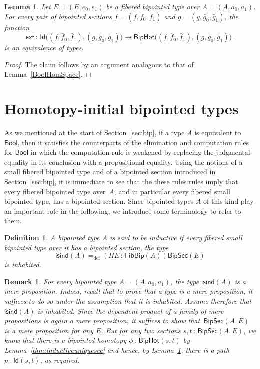 \documentclass[10pt,a4paper,oneside,reqno]{amsart}
\theoremstyle{mythm}
\newtheorem{lemma}[theorem]{Lemma}
\theoremstyle{mydef}
\newtheorem{definition}[theorem]{Definition}
\theoremstyle{myrmk}
\newtheorem{remark}[theorem]{Remark}
\newcommand{\ie}{\text{i.e.\ }}
\newcommand{\defeq}{=_{\mathrm{def}}}
\newcommand{\co}{\,{:}\,}
\newcommand{\isbipind}{\mathsf{isind}}
\newcommand{\ext}{\mathsf{ext}}
\newcommand{\Bool}{\mathsf{Bool}}
\newcommand{\Id}{\mathsf{Id}}
\newcommand{\BipHot}{\mathsf{BipHot}}
\newcommand{\FibBip}{\mathsf{FibBip}}
\newcommand{\BipSec}{\mathsf{BipSec}}
\begin{document}
\begin{lemma} \label{thm:biphot}
Let $E = (E, e_0, e_1)$ be a fibered bipointed type over $A = (A, a_0, a_1)$. 
For every pair of bipointed sections $f = (f, \bar{f}_0, \bar{f}_1)$ and $g = (g, \bar{g}_0, \bar{g}_1)$, 
the function
\[
\ext \co \Id\big( (f, \bar{f}_0, \bar{f}_1), (g, \bar{g}_0, \bar{g}_1) \big) \rightarrow
\BipHot \big( (f, \bar{f}_0, \bar{f}_1), (g, \bar{g}_0, \bar{g}_1) \big) \, .
\]
is an equivalence of types. 
\end{lemma}


\begin{proof} The claim follows by an argument analogous to that of Lemma~\ref{BoolHomSpace}.
\end{proof}







\section{Homotopy-initial bipointed types} 
\label{sec:homibt}


As we mentioned at the start of Section~\ref{sec:bip}, if a type $A$ is equivalent to $\Bool$, then 
it satisfies the counterparts of the elimination and computation rules for $\Bool$ in which the computation rule is 
weakened by replacing the judgmental equality in its conclusion with a propositional equality. Using the notions of a small fibered bipointed type and of a bipointed section introduced in Section~\ref{sec:bip}, it is immediate to see that the these rules rules imply that every fibered bipointed type over~$A$, and in particular every fibered small bipointed type, has a bipointed section. 
Since bipointed types $A$ of this kind  play an important role in the following, we introduce some terminology to refer to them.


 



\begin{definition} A bipointed type $A$ is said to be \emph{inductive} if every fibered small bipointed type over it has a bipointed section, \ie the type
\[ 
\isbipind(A) \defeq (\Pi E \co \FibBip(A))  \BipSec(E)
\]  
is inhabited. \end{definition} 



\begin{remark} For every bipointed type $A = (A, a_0, a_1)$, the type $\isbipind(A)$ is a mere proposition. Indeed, recall that to prove that a type  is a mere proposition, it suffices to do so under the assumption that it is inhabited. Assume therefore that~$\isbipind(A)$ is inhabited. Since the dependent product of a family of mere propositions is again a mere proposition, it suffices to show that~$\BipSec(A,E)$ is a mere proposition for any $E$. But for any two sections $s, t \co \BipSec(A,E)$, we know that there is a 
bipointed homotopy $\phi \co \BipHot(s,t)$ by Lemma~\ref{thm:inductiveuniquesec} and hence, by 
Lemma~\ref{thm:biphot}, there is a path $p \co \Id(s,t)$, as required. 
\end{remark}
\end{document}
